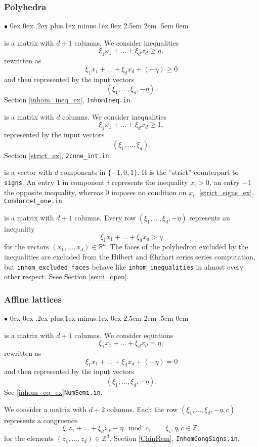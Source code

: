 \documentclass[12pt,a4paper]{scrartcl}
\newcommand{\stdli}{ \topsep0ex \partopsep0ex %
\parsep.2ex plus.1ex minus.1ex \itemsep0ex%
\leftmargin2.5em \labelwidth2em \labelsep.5em \rightmargin0em}%
\renewenvironment{itemize}{\begin{list}{{$\bullet$}}{\stdli}}{\end{list}}
\theoremstyle{definition}
\def\ZZ{{\mathbb Z}}
\def\RR{{\mathbb R}}
\def\itemtt[#1]{\item[\textbf{\ttt{#1}}]}
\def\ttt{\texttt}
\begin{document}
\subsubsection{Polyhedra}

\begin{itemize}
	\itemtt[inhom\_inequalities] is a matrix with $d+1$ columns. We consider inequalities
	$$
	\xi_1x_1+\dots+\xi_dx_d\ge \eta,
	$$
	rewritten as
	$$
	\xi_1x_1+\dots+\xi_dx_d+(-\eta) \ge 0
	$$
	and then represented by the input vectors
	$$
	(\xi_1,\dots,\xi_d,-\eta).
	$$
	Section \ref{inhom_ineq_ex}, \verb|InhomIneq.in|.
	
	\itemtt[strict\_inequalities] is a matrix with $d$ columns. We consider inequalities
	$$
	\xi_1x_1+\dots+\xi_dx_d\ge 1,
	$$
	represented by the input vectors
	$$
	(\xi_1,\dots,\xi_d).
	$$
	Section \ref{strict_ex}, \verb|2cone_int.in|.
	
	\itemtt[strict\_signs] is a vector with $d$ components in $\{-1,0,1\}$. It is the ''strict'' counterpart to \verb|signs|. An entry $1$ in component $i$ represents the inequality $x_i>0$, an entry $-1$ the opposite inequality, whereas $0$ imposes no condition on $x_i$. \ref{strict_signs_ex}, \verb|Condorcet_one.in|
	
	\itemtt[inhom\_excluded\_faces]  is a matrix with $d+1$ columns. Every row $(\xi_1,\dots,\xi_d,-\eta)$ represents an inequality
	$$
	\xi_1x_1+\dots+\xi_dx_d> \eta
	$$
	for the vectors $(x_1,\dots,x_d)\in\RR^d$.  The faces of the polyhedron excluded by the inequalities are excluded from the Hilbert and Ehrhart series series computation, but \verb|inhom_excluded_faces| behave like \verb|inhom_inequalities| in almost every other respect.  Ssee Section \ref{semi_open}.
\end{itemize}

\subsubsection{Affine lattices}

\begin{itemize}
	\itemtt[inhom\_equations] is a matrix with $d+1$ columns. We consider equations
	$$
	\xi_1x_1+\dots+\xi_dx_d= \eta, 
	$$
	rewritten as
	$$
	\xi_1x_1+\dots+\xi_dx_d+(-\eta) = 0
	$$
	and then represented by the input vectors
	$$
	(\xi_1,\dots,\xi_d,-\eta).
	$$
	See \ref{inhom_eq_ex}\verb|NumSemi.in|.
	
	\itemtt[inhom\_congruences] We consider a matrix with $d+2$ columns. Each  the row $(\xi_1,\dots,\xi_d,-\eta,c)$ represents a congruence
	$$
	\xi_1z_1+\dots+\xi_dz_d\equiv \eta \mod c, \qquad \xi_i,\eta,c\in\ZZ,
	$$
	for the elements $(z_1,\dots,z_d)\in\ZZ^d$. Section \ref{ChinRem}, \verb|InhomCongSigns.in|.
\end{itemize}
\end{document}
